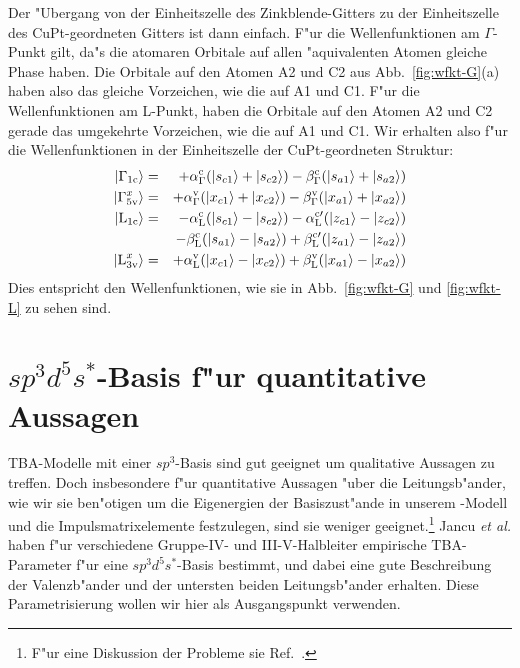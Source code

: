 Der "Ubergang von der Einheitszelle des Zinkblende-Gitters zu der
Einheitszelle des CuPt-geordneten Gitters ist dann einfach. F"ur die
Wellenfunktionen am $\Gamma$-Punkt gilt, da"s die atomaren Orbitale auf allen
"aquivalenten Atomen gleiche Phase haben. Die Orbitale auf den Atomen A2 und
C2 aus Abb.~\ref{fig:wfkt-G}(a) haben also das gleiche Vorzeichen, wie die auf
A1 und C1. F"ur die Wellenfunktionen am L-Punkt, haben die Orbitale auf den
Atomen A2 und C2 gerade das umgekehrte Vorzeichen, wie die auf A1 und C1. Wir
erhalten also f"ur die Wellenfunktionen in der Einheitszelle der
CuPt-geordneten Struktur:
%
\begin{eqnarray*}
| {\Gamma_{1 \text{c}}} \rangle &=& + \alpha_{\Gamma}^{\text{c}} (| {s_{c1}} \rangle + | {s_{c2}} \rangle)
               -  \beta_{\Gamma}^{\text{c}} (| {s_{a1}} \rangle + | {s_{a2}} \rangle) \\
| {\Gamma^{x}_{5 \text{v}}} \rangle&=& + \alpha_{\Gamma}^{\text{v}} (| {x_{c1}} \rangle + | {x_{c2}} \rangle)
               -  \beta_{\Gamma}^{\text{v}} (| {x_{a1}} \rangle + | {x_{a2}} \rangle) \\
| {\text{L}_{1 \text{c}}} \rangle &=& - \alpha_{\text{L}}^{\text{c}} (| {s_{c1}} \rangle - | {s_{c2}} \rangle) 
               - \alpha_{\text{L}}^{\text{c}\prime} (| {z_{c1}} \rangle - | {z_{c2}} \rangle) \\
           &&  -  \beta_{\text{L}}^{\text{c}} (| {s_{a1}} \rangle - | {s_{a2}} \rangle) 
               +  \beta_{\text{L}}^{\text{c}\prime} (| {z_{a1}} \rangle - | {z_{a2}} \rangle) \\
| {\text{L}^{x}_{3 \text{v}}} \rangle&=& + \alpha_{\text{L}}^{\text{v}} (| {x_{c1}} \rangle - | {x_{c2}} \rangle)
               +  \beta_{\text{L}}^{\text{v}} (| {x_{a1}} \rangle - | {x_{a2}} \rangle)
\end{eqnarray*}
%
Dies entspricht den Wellenfunktionen, wie sie in Abb.~\ref{fig:wfkt-G} und
\ref{fig:wfkt-L} zu sehen sind.

\section{$sp^{3}d^{5}s^{\ast}$-Basis f"ur quantitative Aussagen}
\label{sec:sp3d5s*}

TBA-Modelle mit einer $sp^{3}$-Basis sind gut geeignet um qualitative Aussagen
zu treffen. Doch insbesondere f"ur quantitative Aussagen "uber die
Leitungsb"ander, wie wir sie ben"otigen um die Eigenergien der Basiszust"ande
in unserem \kdotp-Modell und die Impulsmatrixelemente festzulegen, sind sie
weniger geeignet.\footnote{F"ur eine Diskussion der Probleme sie
  Ref.~\cite{jsbb:98}.}  
Jancu \emph{et al.} \cite{jsbb:98} haben f"ur verschiedene Gruppe-IV- und
III-V-Halbleiter empirische TBA-Parameter f"ur eine
$sp^{3}d^{5}s^{\ast}$-Basis bestimmt, und dabei eine gute Beschreibung der
Valenzb"ander und der untersten beiden Leitungsb"ander erhalten. Diese
Parametrisierung wollen wir hier als Ausgangspunkt verwenden.

